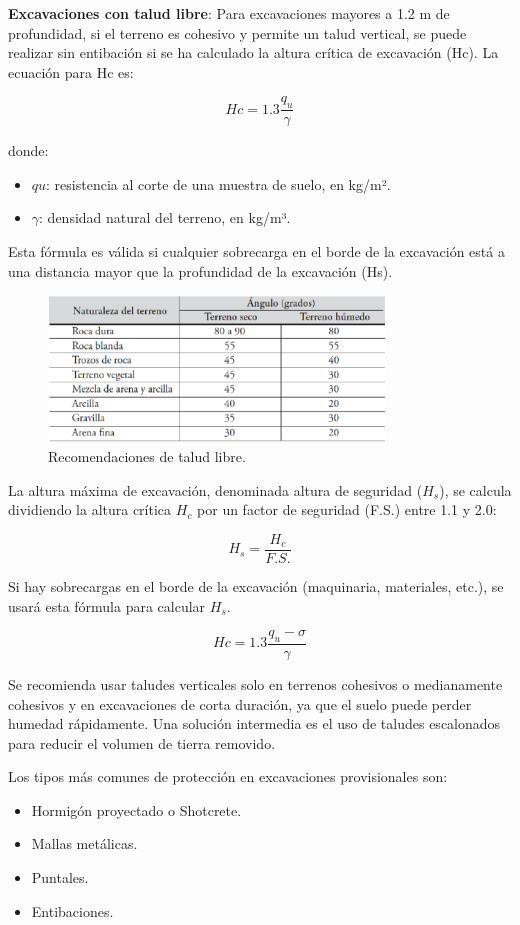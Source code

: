 \textbf{Excavaciones con talud libre}: Para excavaciones mayores a 1.2 m de profundidad, si el terreno es cohesivo y permite un talud vertical, se puede realizar sin entibación si se ha calculado la altura crítica de excavación (Hc). La ecuación para Hc es:

\[
Hc = 1.3 \frac{q_u}{\gamma}
\]

donde:
\begin{itemize}
    \item $qu$: resistencia al corte de una muestra de suelo, en kg/m².
    \item $\gamma$: densidad natural del terreno, en kg/m³.
\end{itemize}

Esta fórmula es válida si cualquier sobrecarga en el borde de la excavación está a una distancia mayor que la profundidad de la excavación (Hs).


\begin{figure}[h]
    \centering
    \includegraphics[width=0.8\textwidth]{aaa.png}
    \caption{Recomendaciones de talud libre.}
    \label{fig:8_1}
\end{figure} 


La altura máxima de excavación, denominada altura de seguridad ($H_s$), se calcula dividiendo la altura crítica $H_c$ por un factor de seguridad (F.S.) entre 1.1 y 2.0:

\[
H_s = \frac{H_c}{F.S.}
\]

Si hay sobrecargas en el borde de la excavación (maquinaria, materiales, etc.), se usará esta fórmula para calcular $H_s$.

\[
Hc = 1.3 \frac{q_u - \sigma}{\gamma}
\]

Se recomienda usar taludes verticales solo en terrenos cohesivos o medianamente cohesivos y en excavaciones de corta duración, ya que el suelo puede perder humedad rápidamente. Una solución intermedia es el uso de taludes escalonados para reducir el volumen de tierra removido.

Los tipos más comunes de protección en excavaciones provisionales son:
\begin{itemize}
    \item Hormigón proyectado o Shotcrete.
    \item Mallas metálicas.
    \item Puntales.
    \item Entibaciones.
\end{itemize}

